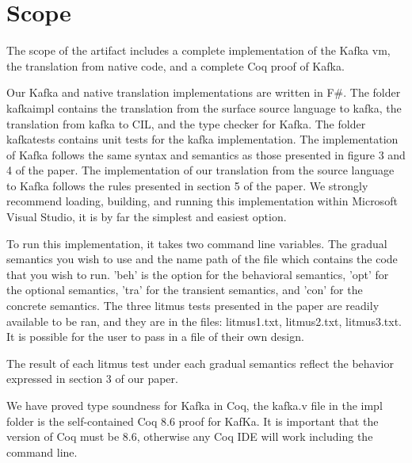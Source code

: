 \documentclass[a4paper,UKenglish]{darts-v2018}
\newenvironment{scope}{\section{Scope}}{}
\begin{document}
\begin{scope}
The scope of the artifact includes a complete implementation of the Kafka vm, the translation from native code, and a complete Coq proof of Kafka.

Our Kafka and native translation implementations are written in F$\#$. The folder kafkaimpl contains the translation from the surface source language to kafka, the translation from kafka to CIL, and the type checker for Kafka. The folder kafkatests contains unit tests for the kafka implementation. The implementation of Kafka follows the same syntax and semantics as those presented in figure 3 and 4 of the paper. The implementation of our translation from the source language to Kafka follows the rules presented in section 5 of the paper. We strongly recommend loading, building, and running this implementation within Microsoft Visual Studio, it is by far the simplest and easiest option. 

To run this implementation, it takes two command line variables. The gradual semantics you wish to use and the name path of the file which contains the code that you wish to run. 'beh' is the option for the behavioral semantics, 'opt' for the optional semantics, 'tra' for the transient semantics, and 'con' for the concrete semantics. The three litmus tests presented in the paper are readily available to be ran, and they are in the files: litmus1.txt, litmus2.txt, litmus3.txt. It is possible for the user to pass in a file of their own design.

The result of each litmus test under each gradual semantics reflect the behavior expressed in section 3 of our paper.

We have proved type soundness for Kafka in Coq, the kafka.v file in the impl folder is the self-contained Coq 8.6 proof for KafKa. It is important that the version of Coq must be 8.6, otherwise any Coq IDE will work including the command line.





\end{scope}
\end{document}
